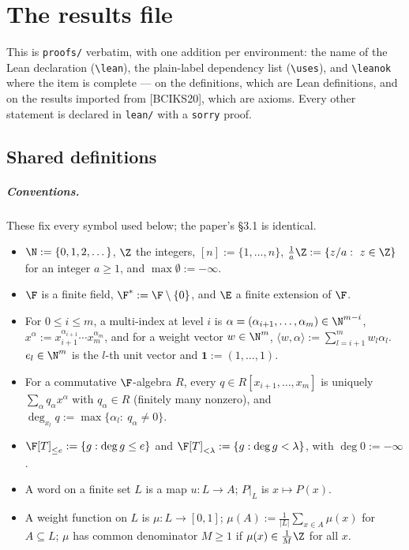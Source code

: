 \chapter{The results file}

\noindent This is \texttt{proofs/} verbatim, with one addition per environment: the name of the Lean
declaration (\verb|\lean|), the plain-label dependency list (\verb|\uses|), and \verb|\leanok| where
the item is complete --- on the definitions, which are Lean definitions, and on the results imported
from [BCIKS20], which are axioms. Every other statement is declared in \texttt{lean/} with a
\texttt{sorry} proof.

\section{Shared definitions}

\paragraph{Conventions.} These fix every symbol used below; the paper's \S3.1 is identical.
\begin{itemize}
\item $\N:=\{0,1,2,\dots\}$, $\Z$ the integers, $[n]:=\{1,\dots,n\}$,
$\frac1a\Z:=\{z/a:\ z\in\Z\}$ for an integer $a\ge1$, and $\max\emptyset:=-\infty$.
\item $\F$ is a finite field, $\F^*:=\F\setminus\{0\}$, and $\E$ a finite extension of $\F$.
\item For $0\le i\le m$, a multi-index at level $i$ is $\alpha=(\alpha_{i+1},\dots,\alpha_m)\in\N^{m-i}$,
$x^\alpha:=x_{i+1}^{\alpha_{i+1}}\cdots x_m^{\alpha_m}$, and for a weight vector $w\in\N^m$,
$\langle w,\alpha\rangle:=\sum_{l=i+1}^mw_l\alpha_l$. $e_l\in\N^m$ is the $l$-th unit vector and
$\mathbf 1:=(1,\dots,1)$.
\item For a commutative $\F$-algebra $R$, every $q\in R[x_{i+1},\dots,x_m]$ is uniquely
$\sum_\alpha q_\alpha x^\alpha$ with $q_\alpha\in R$ (finitely many nonzero), and
$\deg_{x_l}q:=\max\{\alpha_l:\ q_\alpha\ne0\}$.
\item $\F[T]_{\le e}:=\{g:\deg g\le e\}$ and $\F[T]_{<\lambda}:=\{g:\deg g<\lambda\}$, with $\deg0:=-\infty$.
\item A word on a finite set $L$ is a map $u:L\to A$; $P|_L$ is $x\mapsto P(x)$.
\item A weight function on $L$ is $\mu:L\to[0,1]$; $\mu(A):=\frac1{|L|}\sum_{x\in A}\mu(x)$ for
$A\subseteq L$; $\mu$ has common denominator $M\ge1$ if $\mu(x)\in\frac1M\Z$ for all $x$.
\end{itemize}

